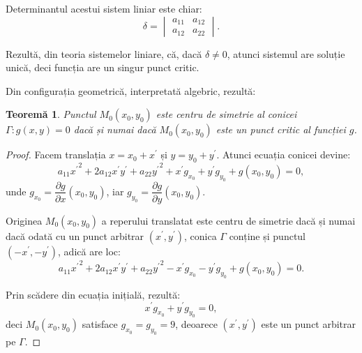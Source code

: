 \documentclass[11pt,a4paper]{article}
\theoremstyle{dotless}
\newtheorem{theorem}{Teorem\u{a}}[section]
\theoremstyle{dotlessdr}
\begin{document}
Determinantul acestui sistem liniar este chiar: 
 \[
	\delta = \begin{vmatrix}
	             a_{11} & a_{12} \\
	             a_{12} & a_{22}
             \end{vmatrix}.
\]

Rezultă, din teoria sistemelor liniare, că, dacă $\delta \neq 0$, atunci 
sistemul are soluție unică, deci funcția are un singur punct critic.

Din configurația geometrică, interpretată algebric, rezultă:

\begin{theorem}
	Punctul $M_0(x_0, y_0)$ este centru de simetrie al conicei 
$\Gamma : g(x, y) = 0$ dacă și numai dacă $M_0(x_0, y_0)$ este un punct critic
al funcției $g$.
\end{theorem}

\begin{proof}
	Facem translația $x = x_0 + x^{\prime}$ și $y = y_0 + y^{\prime}$. Atunci
ecuația conicei devine: 
 \[
	a_{11} {x^{\prime}}^2 + 2a_{12}x^{\prime}y^{\prime} + a_{22} {y^{\prime}}^2
	+ x^{\prime}g_{x_0} + y^{\prime} g_{y_0} + g(x_0, y_0) = 0,
\]
unde $g_{x_0} = \dfrac{\partial g}{\partial x}(x_0, y_0)$, iar
$g_{y_0} = \dfrac{\partial g}{\partial y}(x_0, y_0)$.

Originea $M_0(x_0, y_0)$ a reperului translatat este centru de simetrie dacă
și numai dacă odată cu un punct arbitrar $(x^{\prime}, y^{\prime})$, conica
$\Gamma$ conține și punctul $(-x^{\prime}, -y^{\prime})$, adică are loc: 
 \[
	a_{11} {x^{\prime}}^2 + 2a_{12} x^{\prime} y^{\prime} + a_{22}{y^{\prime}}^2
	- x^{\prime}g_{x_0} - y^{\prime} g_{y_0} + g(x_0, y_0) = 0.
\]

Prin scădere din ecuația inițială, rezultă: 
 \[
	x^{\prime}g_{x_0} + y^{\prime} g_{y_0} = 0,
\]
deci $M_0(x_0, y_0)$ satisface $g_{x_0} = g_{y_0} = 9$, deoarece $(x^{\prime},
y^{\prime})$ este un punct arbitrar pe $\Gamma$.
\end{proof}
\end{document}
